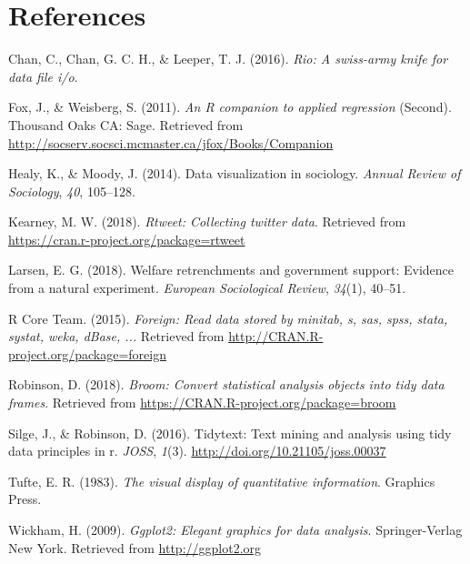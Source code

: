 \documentclass[12pt,oneside]{reedthesis}
\theoremstyle{definition}
\theoremstyle{definition}
\theoremstyle{definition}
\theoremstyle{remark}
\begin{document}
  \backmatter
  
  \chapter{References}\label{references}
  
  \noindent
  
  \setlength{\parindent}{-0.20in} \setlength{\leftskip}{0.20in}
  \setlength{\parskip}{8pt}
  
  \hypertarget{refs}{}
  \hypertarget{ref-chanetal2016}{}
  Chan, C., Chan, G. C. H., \& Leeper, T. J. (2016). \emph{Rio: A
  swiss-army knife for data file i/o}.
  
  \hypertarget{ref-foxweisberg2011}{}
  Fox, J., \& Weisberg, S. (2011). \emph{An R companion to applied
  regression} (Second). Thousand Oaks CA: Sage. Retrieved from
  \url{http://socserv.socsci.mcmaster.ca/jfox/Books/Companion}
  
  \hypertarget{ref-healymoody2014}{}
  Healy, K., \& Moody, J. (2014). Data visualization in sociology.
  \emph{Annual Review of Sociology}, \emph{40}, 105--128.
  
  \hypertarget{ref-rtweet-package}{}
  Kearney, M. W. (2018). \emph{Rtweet: Collecting twitter data}. Retrieved
  from \url{https://cran.r-project.org/package=rtweet}
  
  \hypertarget{ref-larsen2018}{}
  Larsen, E. G. (2018). Welfare retrenchments and government support:
  Evidence from a natural experiment. \emph{European Sociological Review},
  \emph{34}(1), 40--51.
  
  \hypertarget{ref-rcoreteam2015foreign}{}
  R Core Team. (2015). \emph{Foreign: Read data stored by minitab, s, sas,
  spss, stata, systat, weka, dBase, ...} Retrieved from
  \url{http://CRAN.R-project.org/package=foreign}
  
  \hypertarget{ref-Robinson2018}{}
  Robinson, D. (2018). \emph{Broom: Convert statistical analysis objects
  into tidy data frames}. Retrieved from
  \url{https://CRAN.R-project.org/package=broom}
  
  \hypertarget{ref-tidytext2016}{}
  Silge, J., \& Robinson, D. (2016). Tidytext: Text mining and analysis
  using tidy data principles in r. \emph{JOSS}, \emph{1}(3).
  \url{http://doi.org/10.21105/joss.00037}
  
  \hypertarget{ref-tufte1983}{}
  Tufte, E. R. (1983). \emph{The visual display of quantitative
  information}. Graphics Press.
  
  \hypertarget{ref-wickham2009}{}
  Wickham, H. (2009). \emph{Ggplot2: Elegant graphics for data analysis}.
  Springer-Verlag New York. Retrieved from \url{http://ggplot2.org}
  
\end{document}
